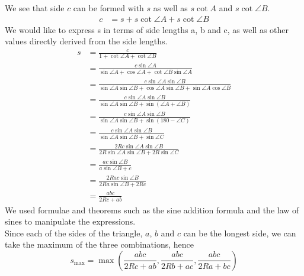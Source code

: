 \documentclass[12pt]{scrartcl}
\begin{document}
We see that side $c$ can be formed with $s$ as well as $s \cot A$ and $s \cot \angle B$.
\begin{align*}
	c & = s+s\cot \angle A+s\cot \angle B                                                                            
\end{align*}
We would like to express s in terms of side lengths a, b and c, as well as other values directly derived from the side lengths. \\
\begin{align*}
	s & = \frac{c}{1+\cot \angle A+\cot \angle B}                                                                      \\
	  & = \frac{c \sin\angle A}{\sin\angle A+\cos\angle A+\cot\angle B\sin\angle A}                                    \\
	  & = \frac{c\sin\angle A\sin\angle B}{\sin\angle A\sin\angle B+\cos\angle A\sin\angle B+\sin\angle A\cos\angle B} \\
	  & = \frac{c\sin\angle A\sin\angle B}{\sin\angle A\sin\angle B+\sin\left(\angle A+\angle B\right)}                \\
	  & = \frac{c\sin\angle A\sin\angle B}{\sin\angle A\sin\angle B+\sin\left(180-\angle C\right)}                     \\
	  & = \frac{c\sin\angle A\sin\angle B}{\sin\angle A\sin\angle B+\sin \angle C}                                     \\
	  & = \frac{2Rc\sin\angle A\sin\angle B}{2R\sin\angle A\sin \angle B+2R\sin \angle C}                              \\
	  & = \frac{ac\sin\angle B}{a\sin\angle B+c}                                                                       \\
	  & = \frac{2Rac\sin\angle B}{2Ra\sin\angle B+2Rc}                                                                 \\
	  & = \frac{abc}{2Rc+ab}                                                                                         
\end{align*}
We used formulae and theorems such as the sine addition formula and the law of sines to manipulate the expressions. \\

Since each of the sides of the triangle, $a$, $b$ and $c$ can be the longest side,
we can take the maximum of the three combinations, hence
\begin{equation}
	s_{\text{max}} = \max\left(\dfrac{abc}{2Rc+ab},\dfrac{abc}{2Rb+ac},\dfrac{abc}{2Ra+bc}\right)
\end{equation}
\end{document}
